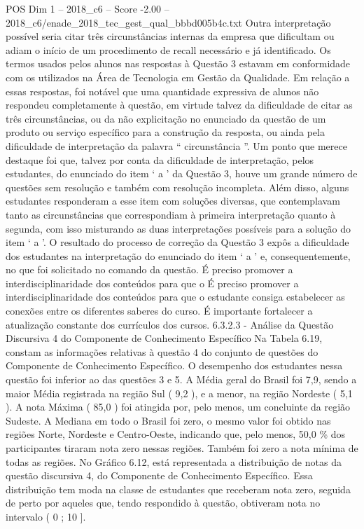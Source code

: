 \begin{textsample}{POS Dim 1 – 2018\_c6 – Score -2.00 – 2018\_c6/enade\_2018\_tec\_gest\_qual\_bbbd005b4c.txt}
Outra interpretação possível seria citar três circunstâncias internas da empresa que dificultam ou adiam o início de um procedimento de recall necessário e já identificado.
Os termos usados pelos alunos nas respostas à Questão 3 estavam em conformidade com os utilizados na Área de Tecnologia em Gestão da Qualidade.
Em relação a essas respostas, foi notável que uma quantidade expressiva de alunos não respondeu completamente à questão, em virtude talvez da dificuldade de citar as três circunstâncias, ou da não explicitação no enunciado da questão de um produto ou serviço específico para a construção da resposta, ou ainda pela dificuldade de interpretação da palavra “ circunstância ”.
Um ponto que merece destaque foi que, talvez por conta da dificuldade de interpretação, pelos estudantes, do enunciado do item ‘ a ’ da Questão 3, houve um grande número de questões sem resolução e também com resolução incompleta.
Além disso, alguns estudantes responderam a esse item com soluções diversas, que contemplavam tanto as circunstâncias que correspondiam à primeira interpretação quanto à segunda, com isso misturando as duas interpretações possíveis para a solução do item ‘ a ’.
O resultado do processo de correção da Questão 3 expôs a dificuldade dos estudantes na interpretação do enunciado do item ‘ a ’ e, consequentemente, no que foi solicitado no comando da questão.
É preciso promover a interdisciplinaridade dos conteúdos para que o É preciso promover a interdisciplinaridade dos conteúdos para que o estudante consiga estabelecer as conexões entre os diferentes saberes do curso.
É importante fortalecer a atualização constante dos currículos dos cursos. 6.3.2.3 - Análise da Questão Discursiva 4 do Componente de Conhecimento Específico Na Tabela 6.19, constam as informações relativas à questão 4 do conjunto de questões do Componente de Conhecimento Específico.
O desempenho dos estudantes nessa questão foi inferior ao das questões 3 e 5.
A Média geral do Brasil foi 7,9, sendo a maior Média registrada na região Sul ( 9,2 ), e a menor, na região Nordeste ( 5,1 ).
A nota Máxima ( 85,0 ) foi atingida por, pelo menos, um concluinte da região Sudeste.
A Mediana em todo o Brasil foi zero, o mesmo valor foi obtido nas regiões Norte, Nordeste e Centro-Oeste, indicando que, pelo menos, 50,0 \% dos participantes tiraram nota zero nessas regiões.
Também foi zero a nota mínima de todas as regiões.
No Gráfico 6.12, está representada a distribuição de notas da questão discursiva 4, do Componente de Conhecimento Específico.
Essa distribuição tem moda na classe de estudantes que receberam nota zero, seguida de perto por aqueles que, tendo respondido à questão, obtiveram nota no intervalo ( 0 ; 10 ].

\end{textsample}
